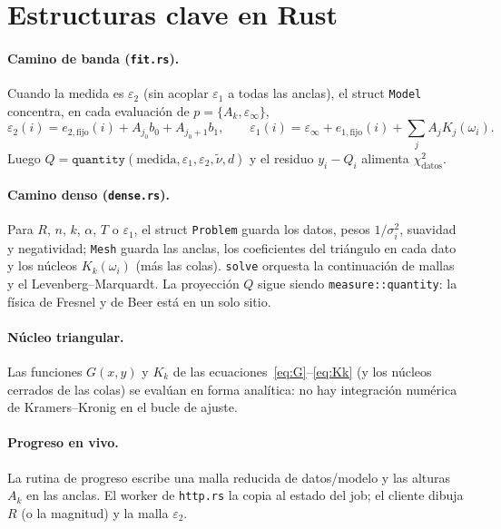 \section{Estructuras clave en Rust}

\paragraph{Camino de banda (\texttt{fit.rs}).}
Cuando la medida es $\varepsilon_2$ (sin acoplar $\varepsilon_1$ a todas las anclas), el struct \texttt{Model} concentra, en cada evaluaci\'on de $p=\{A_k,\varepsilon_\infty\}$,
\begin{equation}
\varepsilon_2(i)=e_{2,\mathrm{fijo}}(i)+A_{j_0}b_0+A_{j_0+1}b_1,
\qquad
\varepsilon_1(i)=\varepsilon_\infty+e_{1,\mathrm{fijo}}(i)+\sum_j A_j K_j(\omega_i).
\end{equation}
Luego $Q=\texttt{quantity}(\mathrm{medida},\varepsilon_1,\varepsilon_2,\tilde\nu,d)$ y el residuo $y_i-Q_i$ alimenta $\chi^{2}_{\mathrm{datos}}$.

\paragraph{Camino denso (\texttt{dense.rs}).}
Para $R$, $n$, $k$, $\alpha$, $T$ o $\varepsilon_1$, el struct \texttt{Problem} guarda los datos, pesos $1/\sigma_i^{2}$, suavidad y negatividad;
\texttt{Mesh} guarda las anclas, los coeficientes del tri\'angulo en cada dato y los n\'ucleos $K_k(\omega_i)$ (m\'as las colas).
\texttt{solve} orquesta la continuaci\'on de mallas y el Levenberg--Marquardt.
La proyecci\'on $Q$ sigue siendo \texttt{measure::quantity}: la f\'isica de Fresnel y de Beer est\'a en un solo sitio.

\paragraph{N\'ucleo triangular.}
Las funciones $G(x,y)$ y $K_k$ de las ecuaciones~\eqref{eq:G}--\eqref{eq:Kk} (y los n\'ucleos cerrados de las colas) se eval\'uan en forma anal\'itica: no hay integraci\'on num\'erica de Kramers--Kronig en el bucle de ajuste.

\paragraph{Progreso en vivo.}
La rutina de progreso escribe una malla reducida de datos/modelo y las alturas $A_k$ en las anclas. El worker de \texttt{http.rs} la copia al estado del job; el cliente dibuja $R$ (o la magnitud) y la malla $\varepsilon_2$.

